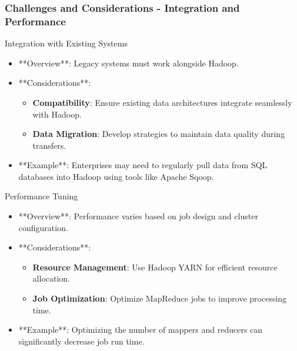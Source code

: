 \documentclass[aspectratio=169]{beamer}
\begin{document}
\begin{frame}[fragile]
    \frametitle{Challenges and Considerations - Integration and Performance}
    \begin{block}{Integration with Existing Systems}
        \begin{itemize}
            \item **Overview**: Legacy systems must work alongside Hadoop.
            \item **Considerations**:
                \begin{itemize}
                    \item \textbf{Compatibility}: Ensure existing data architectures integrate seamlessly with Hadoop.
                    \item \textbf{Data Migration}: Develop strategies to maintain data quality during transfers.
                \end{itemize}
            \item **Example**: Enterprises may need to regularly pull data from SQL databases into Hadoop using tools like Apache Sqoop.
        \end{itemize}
    \end{block}

    \begin{block}{Performance Tuning}
        \begin{itemize}
            \item **Overview**: Performance varies based on job design and cluster configuration.
            \item **Considerations**:
                \begin{itemize}
                    \item \textbf{Resource Management}: Use Hadoop YARN for efficient resource allocation.
                    \item \textbf{Job Optimization}: Optimize MapReduce jobs to improve processing time.
                \end{itemize}
            \item **Example**: Optimizing the number of mappers and reducers can significantly decrease job run time.
        \end{itemize}
    \end{block}
\end{frame}
\end{document}
